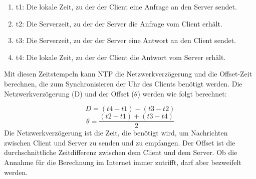 \begin{enumerate}
\item t1: Die lokale Zeit, zu der der Client eine Anfrage an den Server sendet.
\item t2: Die Serverzeit, zu der der Server die Anfrage vom Client erhält.
\item t3: Die Serverzeit, zu der der Server eine Antwort an den Client sendet.
\item t4: Die lokale Zeit, zu der der Client die Antwort vom Server erhält.
\end{enumerate}
Mit diesen Zeitstempeln kann NTP die Netzwerkverzögerung und die Offset-Zeit berechnen, die zum Synchronisieren der Uhr des Clients benötigt werden. Die Netzwerkverzögerung (D) und der Offset (\(\theta\)) werden wie folgt berechnet:

\[ D = (t4 - t1) - (t3 - t2) \]
\[ \theta = \frac{(t2 - t1) + (t3 - t4)}{2} \]
Die Netzwerkverzögerung ist die Zeit, die benötigt wird, um Nachrichten zwischen Client und Server zu senden und zu empfangen. Der Offset ist die durchschnittliche Zeitdifferenz zwischen dem Client und dem Server. Ob die Annahme für die Berechnung im Internet immer zutrifft, darf aber bezweifelt werden.

